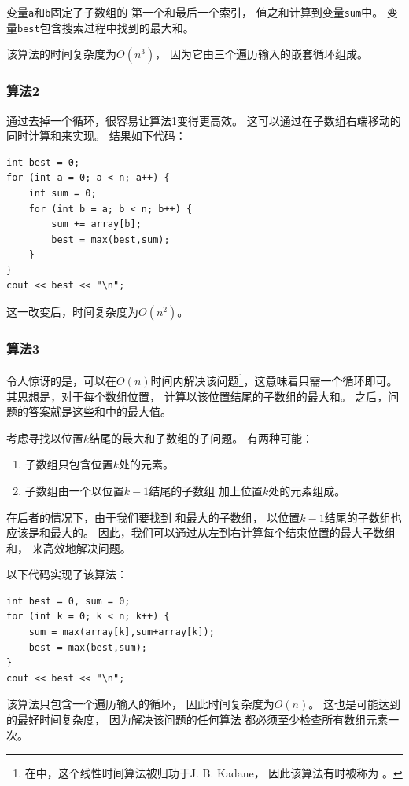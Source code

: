 变量\texttt{a}和\texttt{b}固定了子数组的
第一个和最后一个索引，
值之和计算到变量\texttt{sum}中。
变量\texttt{best}包含搜索过程中找到的最大和。

该算法的时间复杂度为$O(n^3)$，
因为它由三个遍历输入的嵌套循环组成。

\subsubsection{算法2}

通过去掉一个循环，很容易让算法1变得更高效。
这可以通过在子数组右端移动的同时计算和来实现。
结果如下代码：

\begin{lstlisting}
int best = 0;
for (int a = 0; a < n; a++) {
    int sum = 0;
    for (int b = a; b < n; b++) {
        sum += array[b];
        best = max(best,sum);
    }
}
cout << best << "\n";
\end{lstlisting}
这一改变后，时间复杂度为$O(n^2)$。

\subsubsection{算法3}

令人惊讶的是，可以在$O(n)$时间内解决该问题\footnote{在\cite{ben86}中，这个线性时间算法被归功于J. B. Kadane，
因此该算法有时被称为 。}，这意味着只需一个循环即可。
其思想是，对于每个数组位置，
计算以该位置结尾的子数组的最大和。
之后，问题的答案就是这些和中的最大值。

考虑寻找以位置$k$结尾的最大和子数组的子问题。
有两种可能：
\begin{enumerate}
\item 子数组只包含位置$k$处的元素。
\item 子数组由一个以位置$k-1$结尾的子数组
加上位置$k$处的元素组成。
\end{enumerate}

在后者的情况下，由于我们要找到
和最大的子数组，
以位置$k-1$结尾的子数组也应该是和最大的。
因此，我们可以通过从左到右计算每个结束位置的最大子数组和，
来高效地解决问题。

以下代码实现了该算法：
\begin{lstlisting}
int best = 0, sum = 0;
for (int k = 0; k < n; k++) {
    sum = max(array[k],sum+array[k]);
    best = max(best,sum);
}
cout << best << "\n";
\end{lstlisting}

该算法只包含一个遍历输入的循环，
因此时间复杂度为$O(n)$。
这也是可能达到的最好时间复杂度，
因为解决该问题的任何算法
都必须至少检查所有数组元素一次。

